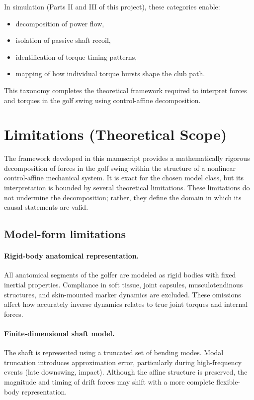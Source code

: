 \documentclass[12pt]{article}
\begin{document}
In simulation (Parts II and III of this project), these categories enable:
\begin{itemize}
  \item decomposition of power flow,
  \item isolation of passive shaft recoil,
  \item identification of torque timing patterns,
  \item mapping of how individual torque bursts shape the club path.
\end{itemize}

This taxonomy completes the theoretical framework required to interpret forces and torques in the golf swing using control-affine decomposition.

\section{Limitations (Theoretical Scope)}
\label{sec:limitations}

The framework developed in this manuscript provides a mathematically rigorous decomposition of forces in the golf swing within the structure of a nonlinear control-affine mechanical system. It is exact for the chosen model class, but its interpretation is bounded by several theoretical limitations. These limitations do not undermine the decomposition; rather, they define the domain in which its causal statements are valid.

\subsection{Model-form limitations}

\paragraph{Rigid-body anatomical representation.}
All anatomical segments of the golfer are modeled as rigid bodies with fixed inertial properties. Compliance in soft tissue, joint capsules, musculotendinous structures, and skin-mounted marker dynamics are excluded. These omissions affect how accurately inverse dynamics relates to true joint torques and internal forces.

\paragraph{Finite-dimensional shaft model.}
The shaft is represented using a truncated set of bending modes. Modal truncation introduces approximation error, particularly during high-frequency events (late downswing, impact). Although the affine structure is preserved, the magnitude and timing of drift forces may shift with a more complete flexible-body representation.
\end{document}
